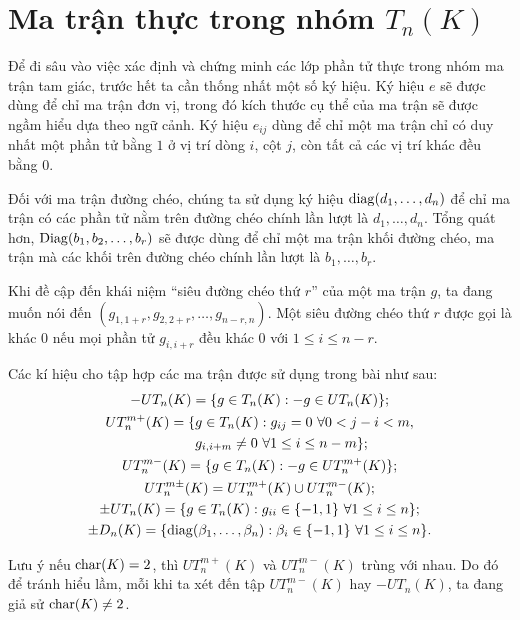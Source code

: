 \chapter{Ma trận thực trong nhóm \texorpdfstring{$T_n(K)$}{Tn(K)}}
\label{ch:chuong2}

Để đi sâu vào việc xác định và chứng minh các lớp phần tử thực trong nhóm ma trận tam giác, trước hết ta cần thống nhất một số ký hiệu. Ký hiệu $e$ sẽ được dùng để chỉ ma trận đơn vị, trong đó kích thước cụ thể của ma trận sẽ được ngầm hiểu dựa theo ngữ cảnh. Ký hiệu $e_{ij}$ dùng để chỉ một ma trận chỉ có duy nhất một phần tử bằng $1$ ở vị trí dòng $i$, cột $j$, còn tất cả các vị trí khác đều bằng $0$. 

Đối với ma trận đường chéo, chúng ta sử dụng ký hiệu $\operatorname{diag}(d_1, \dots, d_n)$ để chỉ ma trận có các phần tử nằm trên đường chéo chính lần lượt là $d_1, \dots, d_n$. Tổng quát hơn, $\operatorname{Diag}(b_1, b_2, \dots, b_r)$ sẽ được dùng để chỉ một ma trận khối đường chéo, ma trận mà các khối trên đường chéo chính lần lượt là $b_1, \dots, b_r$. 

Khi đề cập đến khái niệm ``siêu đường chéo thứ $r$'' của một ma trận $g$, ta đang muốn nói đến $(g_{1, 1+r}, g_{2, 2+r}, \dots, g_{n-r, n})$. Một siêu đường chéo thứ $r$ được gọi là khác 0 nếu mọi phần tử $g_{i, i+r}$ đều khác $0$ với $1\le i\le n-r$.

Các kí hiệu cho tập hợp các ma trận được sử dụng trong bài như sau:
\begin{gather*}
    -UT_n(K) = \{ g \in T_n(K): -g \in UT_n(K) \}; \\
    \begin{aligned}
    UT_n^{m+}(K) = \{ & g \in T_n(K): g_{ij} = 0 ~\forall 0<j-i<m, \\ & g_{i,i+m} \neq 0 ~\forall 1 \le i \le n - m \};
    \end{aligned} \\
    UT_n^{m-}(K) = \{ g \in  T_n(K): -g \in UT_n^{m+}(K) \}; \\
    UT_n^{m\pm}(K) = UT_n^{m+}(K) \cup UT_n^{m-}(K); \\
    \pm UT_n(K) = \{ g \in  T_n(K): g_{ii} \in \{ -1, 1 \} ~\forall 1 \le i \le n \}; \\
    \pm D_n(K) = \{ \operatorname{diag}(\beta_1, \dots, \beta_n): \beta_i \in \{ -1, 1 \} ~\forall 1 \le i \le n \}.
\end{gather*}

Lưu ý nếu $\operatorname{char}(K) = 2$, thì $UT_{n}^{m+}(K)$ và $UT_{n}^{m-}(K)$ trùng với nhau. Do đó để tránh hiểu lầm, mỗi khi ta xét đến tập $UT_{n}^{m-}(K)$ hay $- UT_n(K)$, ta đang giả sử $\operatorname{char}(K)\neq2$.

